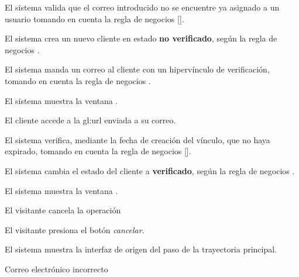 {\begin{trayectoriaPrincipal}
    \item El sistema valida que el correo introducido no se encuentre ya asignado
      a un usuario tomando en cuenta la regla de negocios
       [].

    \item El sistema crea un nuevo cliente en estado \textbf{no verificado},
      según la regla de negocios .

    \item El sistema manda un correo al cliente con un hipervínculo de
      verificación, tomando en cuenta la regla de negocios
      .

    \item El sistema muestra la ventana
      .

    \item El cliente accede a la \gls{gl:url} enviada a su correo.

    \item El sistema verifica, mediante la fecha de creación del vínculo, que no
      haya expirado, tomando en cuenta la regla de negocios
      [].

    \item El sistema cambia el estado del cliente a \textbf{verificado},
      según la regla de negocios .

    \item El sistema muestra la ventana
      .

  \end{trayectoriaPrincipal}

  \begin{trayectoriaAlternativa}[ta:cancelar]
    {El visitante cancela la operación}

    \item El visitante presiona el botón \textit{cancelar}.

    \item El sistema muestra la interfaz de origen del paso
       de la trayectoria principal.

  \end{trayectoriaAlternativa}

  \begin{trayectoriaAlternativa}
    {Correo electrónico incorrecto}


\end{trayectoriaAlternativa}}

